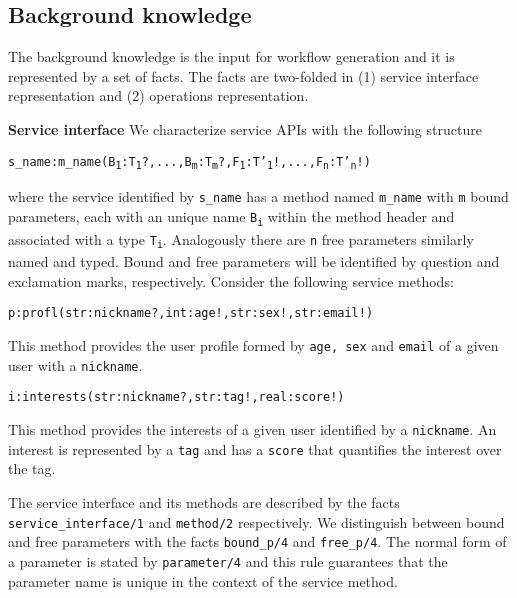 \subsection{Background knowledge} \label{subsec:kb}
The background knowledge is the input for workflow generation and it is represented by a set of facts. The facts are two-folded in (1) service interface representation and (2) operations representation.
               
\textbf{Service interface} We characterize service APIs with the following structure
			
{\texttt{s\_name:m\_name(B\textsubscript{1}:T\textsubscript{1}?,...,B\textsubscript{m}:T\textsubscript{m}?,F\textsubscript{1}:T'\textsubscript{1}!,...,F\textsubscript{n}:T'\textsubscript{n}!)}}

where the service identified by \texttt{s\_name} has a method named \texttt{m\_name} with \texttt{m} bound parameters, each with an unique name \texttt{B\textsubscript{i}} within the method header and associated with a type \texttt{T\textsubscript{i}}. Analogously there are \texttt{n} free parameters similarly named and typed. Bound and free parameters will be identified by question and exclamation marks, respectively. Consider the following service methods:

{\footnotesize\texttt{p:profl(str:nickname?,int:age!,str:sex!,str:email!)}}

This method provides the user profile formed by \texttt{age, sex} and \texttt{email} of a given user with a \texttt{nickname}.

{\footnotesize\texttt{i:interests(str:nickname?,str:tag!,real:score!)}}

This method provides the interests of a given user identified by a \texttt{nickname}. An interest is represented by a \texttt{tag} and has a \texttt{score} that quantifies the interest over the tag.

The service interface and its methods are described by the facts \texttt{service_interface/1} and \texttt{method/2} respectively. We distinguish between bound and free parameters with the facts \texttt{bound_p/4} and \texttt{free_p/4}. The normal form of a parameter is stated by \texttt{parameter/4} and this rule guarantees that the parameter name is unique in the context of the service method.

%


            
